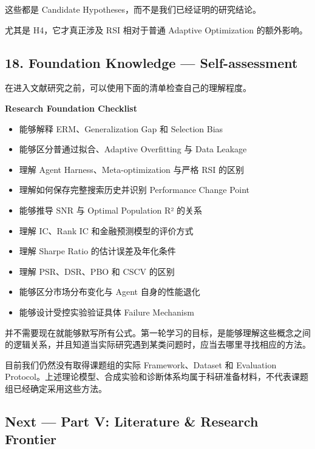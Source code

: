 这些都是 Candidate Hypotheses，而不是我们已经证明的研究结论。

尤其是 H4，它才真正涉及 RSI 相对于普通 Adaptive Optimization 的额外影响。

\hypertarget{part-4-77-0001-foundation-knowledge-self-assessment}{%
\subsection{18. Foundation Knowledge --- Self-assessment}\label{part-4-77-0001-foundation-knowledge-self-assessment}}

在进入文献研究之前，可以使用下面的清单检查自己的理解程度。

\textbf{Research Foundation Checklist}

\begin{itemize}
\item
  能够解释 ERM、Generalization Gap 和 Selection Bias
\item
  能够区分普通过拟合、Adaptive Overfitting 与 Data Leakage
\item
  理解 Agent Harness、Meta-optimization 与严格 RSI 的区别
\item
  理解如何保存完整搜索历史并识别 Performance Change Point
\item
  能够推导 SNR 与 Optimal Population R² 的关系
\item
  理解 IC、Rank IC 和金融预测模型的评价方式
\item
  理解 Sharpe Ratio 的估计误差及年化条件
\item
  理解 PSR、DSR、PBO 和 CSCV 的区别
\item
  能够区分市场分布变化与 Agent 自身的性能退化
\item
  能够设计受控实验验证具体 Failure Mechanism
\end{itemize}

并不需要现在就能够默写所有公式。第一轮学习的目标，是能够理解这些概念之间的逻辑关系，并且知道当实际研究遇到某类问题时，应当去哪里寻找相应的方法。

目前我们仍然没有取得课题组的实际 Framework、Dataset 和 Evaluation Protocol。上述理论模型、合成实验和诊断体系均属于科研准备材料，不代表课题组已经确定采用这些方法。

\Needspace{.34\textheight}
\hypertarget{part-4-77-0001-next-part-v-literature-research-frontier}{%
\subsection{Next --- Part V: Literature \& Research Frontier}\label{part-4-77-0001-next-part-v-literature-research-frontier}}

